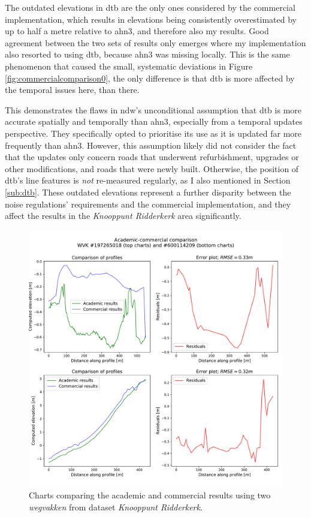 The outdated elevations in \ac{dtb} are the only ones considered by the commercial implementation, which results in elevations being consistently overestimated by up to half a metre relative to \ac{ahn3}, and therefore also my results. Good agreement between the two sets of results only emerges where my implementation also resorted to using \ac{dtb}, because \ac{ahn3} was missing locally. This is the same phenomenon that caused the small, systematic deviations in Figure \ref{fig:commercialcomparison0}, the only difference is that \ac{dtb} is more affected by the temporal issues here, than there.

This demonstrates the flaws in \ac{ndw}'s unconditional assumption that \ac{dtb} is more accurate spatially and temporally than \ac{ahn3}, especially from a temporal updates perspective. They specifically opted to prioritise its use as it is updated far more frequently than \ac{ahn3}. However, this assumption likely did not consider the fact that the updates only concern roads that underwent refurbishment, upgrades or other modifications, and roads that were newly built. Otherwise, the position of \ac{dtb}'s line features is \textit{not} re-measured regularly, as I also mentioned in Section \ref{sub:dtb}. These outdated elevations represent a further disparity between the noise regulations' requirements and the commercial implementation, and they affect the results in the \textit{Knooppunt Ridderkerk} area significantly.

\begin{figure}
    \centering
    \includegraphics[width=0.87\linewidth]{final_report/figs/commercialcomparison2.pdf}
    \caption[Charts comparing the academic and commercial results (\textit{Knooppunt Ridderkerk})]{Charts comparing the academic and commercial results using two \textit{wegvakken} from dataset \textit{Knooppunt Ridderkerk}.}
    \label{fig:commercialcomparison2}
\end{figure}

